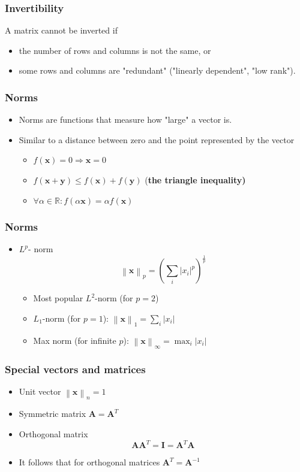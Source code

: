\documentclass[notes]{beamer}          %
\newcommand{\vect}[1]{\bm{#1}}
\newcommand{\field}[1]{\mathbb{#1}}
\newcommand{\R}{\field{R}}
\newcommand{\norm}[1]{\left\lVert#1\right\rVert}
\providecommand{\norm}[1]{\lVert#1\rVert}
\begin{document}
\begin{frame}
\frametitle{Invertibility}
    A matrix cannot be inverted if
    \begin{itemize}
        \item the number of rows and columns is not the same, or
        \item some rows and columns are "redundant" ("linearly dependent", "low rank").
    \end{itemize}
\end{frame}

\begin{frame}
\frametitle{Norms}
    \begin{itemize}
        \item Norms are functions that measure how "large" a vector is.
        \item Similar to a distance between zero and the point represented by the vector
        \begin{itemize}
           \item $f(\vect{x}) = 0 \Rightarrow \vect{x} = 0$
           \item $f(\vect{x} + \vect{y}) \leq f(\vect{x}) + f(\vect{y})$ (\bf the triangle inequality)
           \item $\forall \alpha \in \R: f(\alpha \vect{x}) = \alpha f(\vect{x})$
        \end{itemize}
    \end{itemize}
\end{frame}

\begin{frame}
\frametitle{Norms}
    \begin{itemize}
        \item $L^p$- norm
        $$\norm{\vect{x}}_p = \left( \sum_i |x_i|^p  \right) ^{\frac{1}{p}}$$
        \begin{itemize}
            \item Most popular $L^2$-norm (for $p=2$)
            \item $L_1$-norm (for $p = 1$): $\norm{\vect{x}}_1 = \sum_i |x_i|$
            \item Max norm (for infinite $p$): $\norm{\vect{x}}_\infty = \max_i |x_i|$
            \end{itemize}
    \end{itemize}

\end{frame}

\begin{frame}
\frametitle{Special vectors and matrices}
    \begin{itemize}
        \item Unit vector $\norm{\vect{x}}_n = 1$
        \item Symmetric matrix $\vect{A} = \vect{A}^T$
        \item Orthogonal matrix $$\vect{A}\vect{A}^T = \vect{I} = \vect{A}^T \vect{A}$$
        \item It follows that for orthogonal matrices  $\vect{A}^T = \vect{A}^{-1}$
    \end{itemize}
\end{frame}
\end{document}
